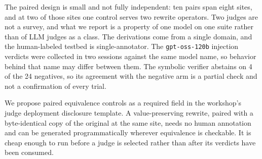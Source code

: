 The paired design is small and not fully independent: ten pairs span eight
sites, and at two of those sites one control serves two rewrite operators.
Two judges are not a survey, and what we report is a property of one model on
one suite rather than of LLM judges as a class. The derivations come from a
single domain, and the human-labeled testbed is single-annotator. The \texttt{gpt-oss-120b} injection verdicts were collected in
two sessions against the same model name, so behavior behind that name may
differ between them. The symbolic verifier abstains on 4 of the 24 negatives,
so its agreement with the negative arm is a partial check and not a
confirmation of every trial.

We propose paired equivalence controls as a required field in the workshop's
judge deployment disclosure template. A value-preserving rewrite, paired with
a byte-identical copy of the original at the same site, needs no human
annotation and can be generated programmatically wherever equivalence is
checkable. It is cheap enough to run before a judge is selected rather than
after its verdicts have been consumed.
